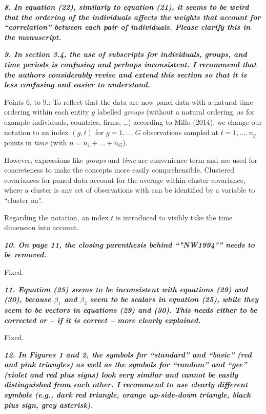 \documentclass[10pt,a4paper]{article}
\begin{document}
\medskip

\textbf{\textit{8. In equation (22), similarly to equation (21), it seems to be weird that the ordering of
the individuals affects the weights that account for ``correlation'' between each pair of
individuals. Please clarify this in the manuscript.}}

\medskip

\textbf{\textit{9. In section 3.4, the use of subscripts for individuals, groups, and time periods is confusing
and perhaps inconsistent. I recommend that the authors considerably revise and extend
this section so that it is less confusing and easier to understand.}}

\medskip

 Points 6. to 9.: To reflect that the data are now panel data with a natural time ordering within each entity $g$ labelled \emph{groups} (without a natural ordering, as for example individuals, countries, firms, \ldots) according to Millo (2014), we change our notation
to an index $(g, t)$ for $g = 1, \dots, G$ observations sampled at $t = 1, \ldots, n_g$ points in \emph{time} (with $n = n_1 + \dots + n_G$).

However, expressions like \emph{groups} and \emph{time} are convenience term and are used for concreteness to make the concepts more easily comprehensible. Clustered covariances for paned data account for the average within-cluster covariance, where a cluster is any set of observations with can be identified by a variable to ``cluster on''. 

Regarding the notation, an index $t$ is introduced to visibly take the time dimension into account.

\medskip

\textbf{\textit{10. On page 11, the closing parenthesis behind ``"NW1994"'' needs to be removed.}}

\medskip

Fixed.

\medskip

\textbf{\textit{11. Equation (25) seems to be inconsistent with equations (29) and (30), because $\beta_1$ and
$\beta_2$ seem to be scalars in equation (25), while they seem to be vectors in equations (29)
and (30). This needs either to be corrected or -- if it is correct -- more clearly explained.}}

\medskip

Fixed.

\medskip

\textbf{\textit{12. In Figures 1 and 2, the symbols for ``standard'' and ``basic'' (red and pink triangles)
as well as the symbols for ``random'' and ``gee'' (violet and red plus signs) look very
similar and cannot be easily distinguished from each other. I recommend to use clearly
different symbols (e.g., dark red triangle, orange up-side-down triangle, black plus sign,
grey asterisk).}}
\end{document}

